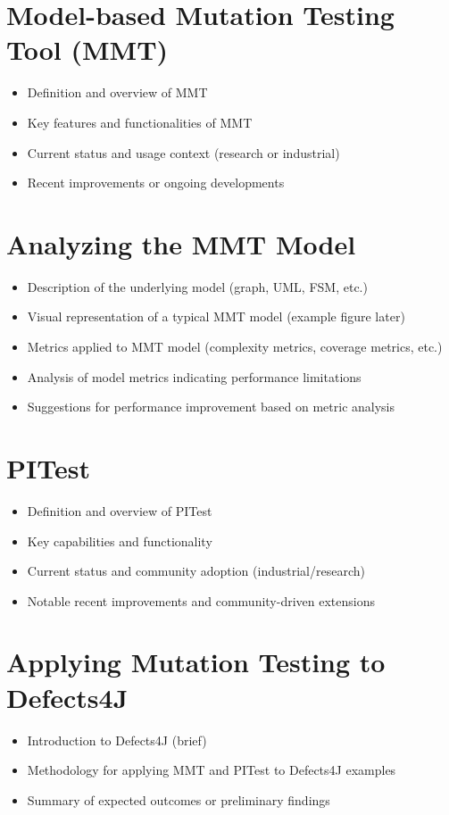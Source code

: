 \documentclass[sigplan, nonacm]{acmart}
\begin{document}
\section{Model-based Mutation Testing Tool (MMT)}
\begin{itemize}
    \item Definition and overview of MMT
    \item Key features and functionalities of MMT
    \item Current status and usage context (research or industrial)
    \item Recent improvements or ongoing developments
\end{itemize}

\section{Analyzing the MMT Model}
\begin{itemize}
    \item Description of the underlying model (graph, UML, FSM, etc.)
    \item Visual representation of a typical MMT model (example figure later)
    \item Metrics applied to MMT model (complexity metrics, coverage metrics, etc.)
    \item Analysis of model metrics indicating performance limitations
    \item Suggestions for performance improvement based on metric analysis
\end{itemize}

\section{PITest}
\begin{itemize}
    \item Definition and overview of PITest
    \item Key capabilities and functionality
    \item Current status and community adoption (industrial/research)
    \item Notable recent improvements and community-driven extensions
\end{itemize}

\section{Applying Mutation Testing to Defects4J}
\begin{itemize}
    \item Introduction to Defects4J (brief)
    \item Methodology for applying MMT and PITest to Defects4J examples
    \item Summary of expected outcomes or preliminary findings
\end{itemize}
\end{document}
